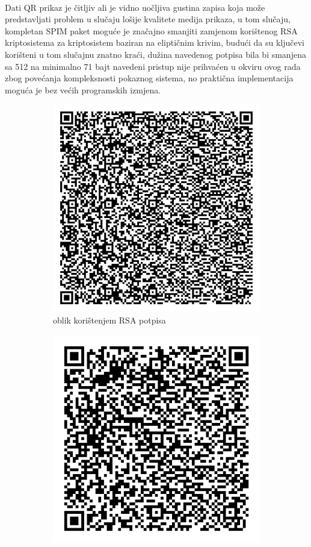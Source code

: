 \paragraph*{}
Dati QR prikaz je čitljiv ali je vidno uočljiva gustina zapisa koja može predstavljati problem u slučaju lošije kvalitete medija prikaza, u tom slučaju, kompletan SPIM paket moguće je značajno smanjiti zamjenom korištenog RSA kriptosistema za kriptosistem baziran na eliptičnim krivim, budući da su ključevi korišteni u tom slučajnu znatno kraći\cite{atmelecc}, dužina navedenog potpisa bila bi smanjena sa 512 na minimalno 71 bajt\cite{cheneau2009ecc} navedeni pristup nije prihvaćen u okviru ovog rada zbog povećanja kompleksnosti pokaznog sistema, no praktična implementacija moguća je bez većih programskih izmjena.

\begin{figure}[H]
    \centering
    \begin{subfigure}{.5\textwidth}
        \centering
        \includegraphics[width=.8\textwidth]{material/logit_qr}
        \caption{oblik korištenjem RSA potpisa}
        \label{img:qr_rsa}
    \end{subfigure}%
    \begin{subfigure}{.5\textwidth}
        \centering
        \includegraphics[width=.8\textwidth]{material/logit_qr_ec}

\end{subfigure}
\end{figure}
